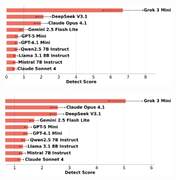 \documentclass{article}
\begin{document}
\begin{figure}[htbp]
    \begin{subfigure}[b]{0.48\textwidth}
        \centering
        \includegraphics[width=\textwidth]{../results/scores_detect.png}
    \end{subfigure}
    \hfill
    \begin{subfigure}[b]{0.48\textwidth}
        \centering
        \includegraphics[width=\textwidth]{../results/scores_detect_hierarchical.png}
    \end{subfigure}
    
    \vspace{0.5cm}
    

\end{figure}
\end{document}
